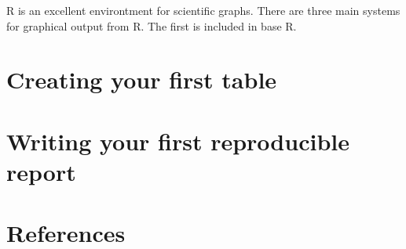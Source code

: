 \documentclass[
  11pt,
]{krantz}
\begin{document}
R is an excellent environtment for scientific graphs. There are three main systems for graphical output from R. The first is included in base R.

\hypertarget{creating-your-first-table}{%
\chapter{Creating your first table}\label{creating-your-first-table}}

\hypertarget{writing-your-first-reproducible-report}{%
\chapter{Writing your first reproducible report}\label{writing-your-first-reproducible-report}}

\hypertarget{references}{%
\chapter{References}\label{references}}

  
\end{document}

